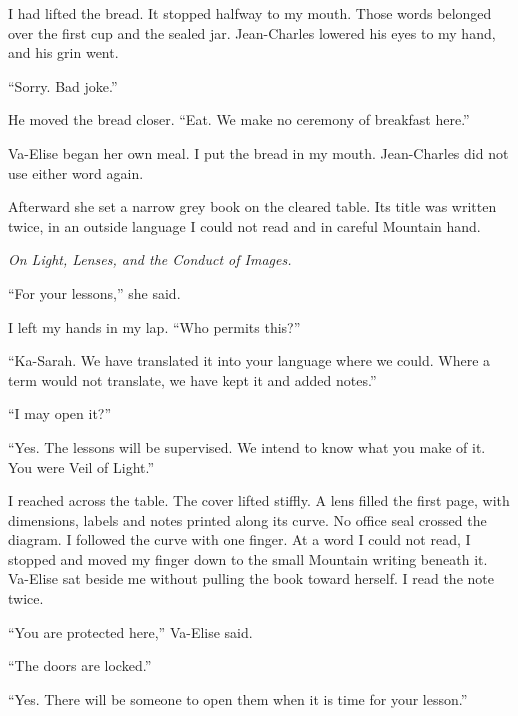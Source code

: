 I had lifted the bread. It stopped halfway to my mouth. Those words belonged over the first cup and the sealed jar. Jean-Charles lowered his eyes to my hand, and his grin went.\par

``Sorry. Bad joke.''\par

He moved the bread closer. ``Eat. We make no ceremony of breakfast here.''\par

Va-Elise began her own meal. I put the bread in my mouth. Jean-Charles did not use either word again.\par

Afterward she set a narrow grey book on the cleared table. Its title was written twice, in an outside language I could not read and in careful Mountain hand.\par

\textit{On Light, Lenses, and the Conduct of Images.}\par

``For your lessons,'' she said.\par

I left my hands in my lap. ``Who permits this?''\par

``Ka-Sarah. We have translated it into your language where we could. Where a term would not translate, we have kept it and added notes.''\par

``I may open it?''\par

``Yes. The lessons will be supervised. We intend to know what you make of it. You were Veil of Light.''\par

I reached across the table. The cover lifted stiffly. A lens filled the first page, with dimensions, labels and notes printed along its curve. No office seal crossed the diagram. I followed the curve with one finger. At a word I could not read, I stopped and moved my finger down to the small Mountain writing beneath it. Va-Elise sat beside me without pulling the book toward herself. I read the note twice.\par

``You are protected here,'' Va-Elise said.\par

``The doors are locked.''\par

``Yes. There will be someone to open them when it is time for your lesson.''\par

